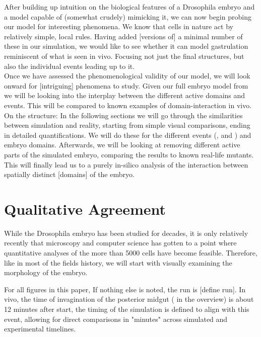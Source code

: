 After building up intuition on the biological features of a Drosophila embryo and a model capable of (somewhat crudely) mimicking it, we can now begin probing our model for interesting phenomena. We know that cells in nature act by relatively simple, local rules. Having added [versions of] a minimal number of these in our simulation, we would like to see whether it can model gastrulation reminiscent of what is seen in vivo. Focusing not just the final structures, but also the individual events leading up to it. \\

Once we have assessed the phenomenological validity of our model, we will look onward for [intriguing] phenomena to study. Given our full embryo model from we will be looking into the interplay between the different active domains and events. This will be compared to known examples of domain-interaction in vivo.\reph\\


On the structure: In the following sections we will go through the similarities between simulation and reality, starting from simple visual comparisons, ending in detailed quantifications. We will do these for the different events (,  and ) and embryo domains. Afterwards, we will be looking at removing different active parts of the simulated embryo, comparing the results to known real-life mutants. This will finally lead us to a purely in-silico analysis of the interaction between spatially distinct [domains] of the embryo.\\ 

\renewcommand{\contentsname}{Results Section Table of Contents}
 \setcounter{tocdepth}{3}
\localtableofcontents
\renewcommand{\contentsname}{Table of Contents}
 \setcounter{tocdepth}{1} 


\newpage

\section{Qualitative Agreement}
While the Drosophila embryo has been studied for decades, it is only relatively recently that microscopy and computer science has gotten to a point where quantitative analyses of the more than 5000 cells have become feasible. Therefore, like in most of the fields history, we will start with visually examining the morphology of the embryo. 

For all figures in this paper, If nothing else is noted, the run is [define run]. In vivo, the time of invagination of the posterior midgut ( in the overview) is about 12 minutes after start, the timing of the simulation is defined to align with this event, allowing for direct comparisons in "minutes" across simulated and experimental timelines.\\


